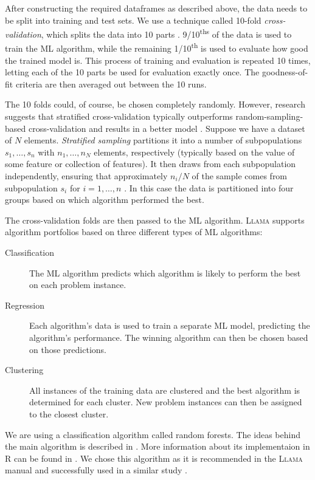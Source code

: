 \documentclass{l4proj}
\theoremstyle{definition}
\theoremstyle{remark}
\begin{document}
After constructing the required dataframes as described above, the data needs to
be split into training and test sets. We use a technique called 10-fold
\emph{cross-validation}, which splits the data into 10 parts \cite{citeulike:1304145}.
9/10\textsuperscript{ths} of the data is used to train the ML algorithm, while
the remaining 1/10\textsuperscript{th} is used to evaluate how good the trained
model is. This process of training and evaluation is repeated 10 times, letting
each of the 10 parts be used for evaluation exactly once. The goodness-of-fit
criteria are then averaged out between the 10 runs.

The 10 folds could, of course, be chosen completely randomly. However, research
suggests that stratified cross-validation typically outperforms
random-sampling-based cross-validation and results in a better model
\cite{DBLP:conf/ijcai/Kohavi95}. Suppose we have a dataset of $N$ elements.
\emph{Stratified sampling} partitions it into a number of subpopulations $s_1,
\dots, s_n$ with $n_1, \dots, n_N$ elements, respectively (typically based on
the value of some feature or collection of features). It then draws from each
subpopulation independently, ensuring that approximately $n_i/N$ of the sample
comes from subpopulation $s_i$ for $i = 1, \dots, n$ \cite{lohr2009sampling}. In
this case the data is partitioned into four groups based on which algorithm
performed the best.

The cross-validation folds are then passed to the ML algorithm. \textsc{Llama}
supports algorithm portfolios based on three different types of ML algorithms:

\begin{description}
  \item[Classification] The ML algorithm predicts which algorithm is likely to
    perform the best on each problem instance.
  \item[Regression] Each algorithm's data is used to train a separate ML model,
    predicting the algorithm's performance. The winning algorithm can then be
    chosen based on those predictions.
  \item[Clustering] All instances of the training data are clustered and the
    best algorithm is determined for each cluster. New problem instances can
    then be assigned to the closest cluster.
\end{description}

We are using a classification algorithm called random forests. The ideas behind
the main algorithm is described in \cite{DBLP:journals/ml/Breiman01}. More
information about its implementaion in R can be found in \cite{randomforest}. We
chose this algorithm as it is recommended in the \textsc{Llama} manual
\cite{kotthoff_llama_2013} and successfully used in a similar study
\cite{DBLP:conf/lion/KotthoffMS16}.
\end{document}
